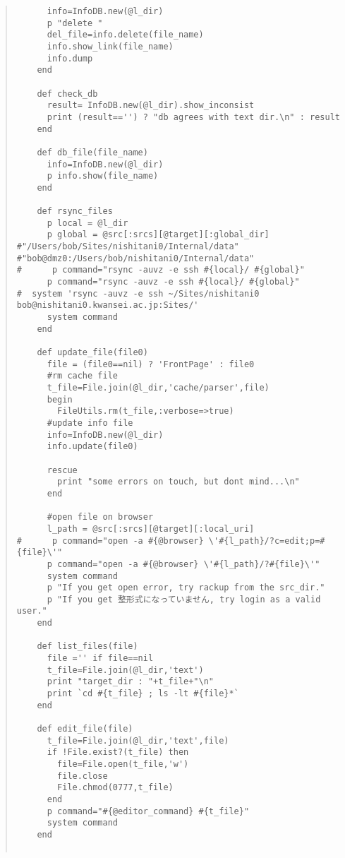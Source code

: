 \documentclass[10pt,a4j]{article}
\begin{document}
\begin{quote}
\begin{verbatim}
      info=InfoDB.new(@l_dir)
      p "delete "
      del_file=info.delete(file_name)
      info.show_link(file_name)
      info.dump
    end

    def check_db
      result= InfoDB.new(@l_dir).show_inconsist
      print (result=='') ? "db agrees with text dir.\n" : result
    end

    def db_file(file_name)
      info=InfoDB.new(@l_dir)
      p info.show(file_name)
    end

    def rsync_files
      p local = @l_dir
      p global = @src[:srcs][@target][:global_dir]
#"/Users/bob/Sites/nishitani0/Internal/data"                                 
#"bob@dmz0:/Users/bob/nishitani0/Internal/data"                              
#      p command="rsync -auvz -e ssh #{local}/ #{global}"                    
      p command="rsync -auvz -e ssh #{local}/ #{global}"
#  system 'rsync -auvz -e ssh ~/Sites/nishitani0 bob@nishitani0.kwansei.ac.jp:Sites/'                                                                    
      system command
    end

    def update_file(file0)
      file = (file0==nil) ? 'FrontPage' : file0
      #rm cache file                                                         
      t_file=File.join(@l_dir,'cache/parser',file)
      begin
        FileUtils.rm(t_file,:verbose=>true)
      #update info file                                                      
      info=InfoDB.new(@l_dir)
      info.update(file0)

      rescue
        print "some errors on touch, but dont mind...\n"
      end

      #open file on browser                                                  
      l_path = @src[:srcs][@target][:local_uri]
#      p command="open -a #{@browser} \'#{l_path}/?c=edit;p=#{file}\'"       
      p command="open -a #{@browser} \'#{l_path}/?#{file}\'"
      system command
      p "If you get open error, try rackup from the src_dir."
      p "If you get 整形式になっていません, try login as a valid user."
    end

    def list_files(file)
      file ='' if file==nil
      t_file=File.join(@l_dir,'text')
      print "target_dir : "+t_file+"\n"
      print `cd #{t_file} ; ls -lt #{file}*`
    end

    def edit_file(file)
      t_file=File.join(@l_dir,'text',file)
      if !File.exist?(t_file) then
        file=File.open(t_file,'w')
        file.close
        File.chmod(0777,t_file)
      end
      p command="#{@editor_command} #{t_file}"
      system command
    end


\end{verbatim}
\end{quote}
\end{document}

